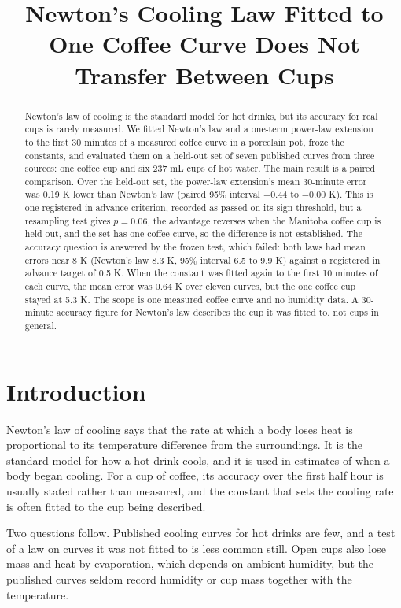 \documentclass[11pt,letterpaper]{article}
\title{Newton's Cooling Law Fitted to One Coffee Curve Does Not Transfer Between Cups}
\author{}
\date{}
\begin{document}
\maketitle

\begin{abstract}
Newton's law of cooling is the standard model for hot drinks, but its accuracy for real cups is rarely measured. We fitted Newton's law and a one-term power-law extension to the first 30 minutes of a measured coffee curve in a porcelain pot, froze the constants, and evaluated them on a held-out set of seven published curves from three sources: one coffee cup and six 237 mL cups of hot water. The main result is a paired comparison. Over the held-out set, the power-law extension's mean 30-minute error was 0.19 K lower than Newton's law (paired 95\% interval $-$0.44 to $-$0.00 K). This is one registered in advance criterion, recorded as passed on its sign threshold, but a resampling test gives $p = 0.06$, the advantage reverses when the Manitoba coffee cup is held out, and the set has one coffee curve, so the difference is not established. The accuracy question is answered by the frozen test, which failed: both laws had mean errors near 8 K (Newton's law 8.3 K, 95\% interval 6.5 to 9.9 K) against a registered in advance target of 0.5 K. When the constant was fitted again to the first 10 minutes of each curve, the mean error was 0.64 K over eleven curves, but the one coffee cup stayed at 5.3 K. The scope is one measured coffee curve and no humidity data. A 30-minute accuracy figure for Newton's law describes the cup it was fitted to, not cups in general.
\end{abstract}

\section{Introduction}

Newton's law of cooling says that the rate at which a body loses heat is proportional to its temperature difference from the surroundings. It is the standard model for how a hot drink cools, and it is used in estimates of when a body began cooling. For a cup of coffee, its accuracy over the first half hour is usually stated rather than measured, and the constant that sets the cooling rate is often fitted to the cup being described.

Two questions follow. Published cooling curves for hot drinks are few, and a test of a law on curves it was not fitted to is less common still. Open cups also lose mass and heat by evaporation, which depends on ambient humidity, but the published curves seldom record humidity or cup mass together with the temperature.
\end{document}
